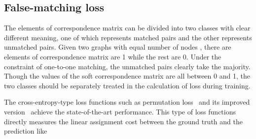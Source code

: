 \documentclass[final]{cvpr}
\begin{document}
\iffalse
Though deep graph matching framework can extract CNN features for matching rather than handcrafted attributes as in traditional QAP formulation, there are two main reasons why CNN features along are not enough for graph matching. Firstly because the spatial resolution of feature map on high level convolution layer is not the same as input image and the features from CNN layers will only be interpolated to the graph nodes as approximation. Secondly because the nodes with similar local patches have the similar CNN features while their structure context may be very different. Although some works~\cite{fey2020deep,rolinek2020deep,yu2020learning} explicitly consider the learned or handcrafted pairwise features as a complement to the unary node features, the problems about CNN features mentioned above can not be avoid. Besides, the refinement step of using GCN is also a compromise because it is essentially a smooth operation over neighbor features of each node and can incorporate the information of graph structure only to a limit extent. Thus far, none of the above parts explicitly involve the structure constraint to maximize the adjacency consensus or minimize the adjacency inconsistency.
\fi

\subsection{False-matching loss}
\label{subsec:fmloss}
 The elements of correspondence matrix can be divided into two classes with clear different meaning, one of which represents matched pairs and the other represents unmatched pairs. Given two graphs with equal number of nodes , there are  elements of correspondence matrix are 1 while the rest  are 0. Under the constraint of one-to-one matching, the unmatched pairs clearly take the majority. Though the values of the soft correspondence matrix are all between 0 and 1, the two classes should be separately treated in the calculation of loss during training.

The cross-entropy-type loss functions such as permutation loss~\cite{wang2019learning} and its improved version~\cite{yu2020learning} achieve the state-of-the-art performance. This type of loss functions directly measures the linear assignment cost between the ground truth  and the prediction  like
\end{document}

